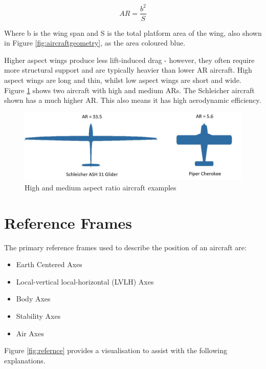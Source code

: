 \begin{equation}
    AR = \frac{b^2}{S}
    \label{eqn:Aspect}
\end{equation}

 Where b is the wing span and S is the total platform area of the wing, also shown in Figure \ref{fig:aircraftgeometry}, as the area coloured blue. 

Higher aspect wings produce less lift-induced drag - however, they often require more structural support and are typically heavier than lower AR aircraft. High aspect wings are long and thin, whilst low aspect wings are short and wide. Figure \ref{fig:AR} shows two aircraft with high and medium ARs. The Schleicher aircraft shown has a much higher AR. This also means it has high aerodynamic efficiency. 



\begin{figure}[H]
  \centering
  \includegraphics[width=1\linewidth]{03_LiteratureReview/Figs/AspectRatio.JPG}
  \caption{High and medium aspect ratio aircraft examples}
  \label{fig:AR}
\end{figure}

\section{Reference Frames}
The primary reference frames used to describe the position of an aircraft are:
\begin{itemize}
    \item Earth Centered Axes
    \item Local-vertical local-horizontal (LVLH) Axes
    \item Body Axes
    \item Stability Axes
    \item Air Axes
\end{itemize}

Figure \ref{fig:refernce} provides a visualisation to assist with the following explanations.

